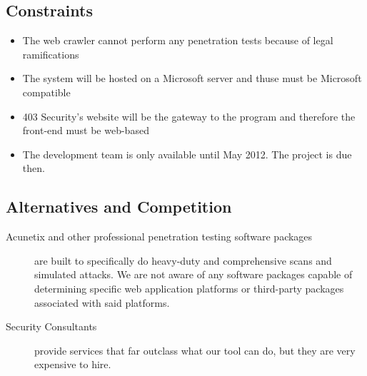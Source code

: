 \subsection{Constraints}
\begin{itemize}
    \item The web crawler cannot perform any penetration tests because of legal ramifications
    \item The system will be hosted on a Microsoft server and thuse must be Microsoft compatible
    \item 403 Security's website will be the gateway to the program and therefore the front-end must be web-based
    \item The development team is only available until May 2012.  The project is due then.
\end{itemize}

\subsection{Alternatives and Competition}
\begin{description}
\item[Acunetix and other professional penetration testing software packages]{ are built to specifically do heavy-duty and comprehensive scans and simulated attacks. We are not aware of any software packages capable of determining specific web application platforms or third-party packages associated with said platforms.}

\item[Security Consultants]{ provide services that far outclass what our tool can do, but they are very expensive to hire.}
\end{description}